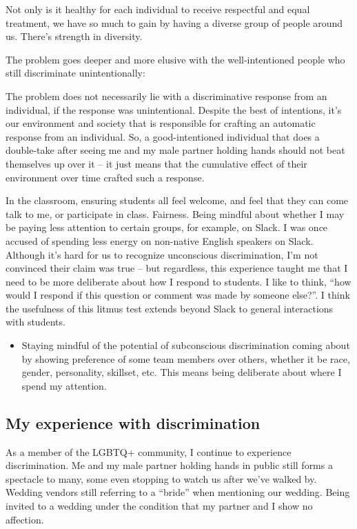 \documentclass[]{article}
\providecommand{\tightlist}{%
  \setlength{\itemsep}{0pt}\setlength{\parskip}{0pt}}
\begin{document}
Not only is it healthy for each individual to receive respectful and equal treatment, we have so much to gain by having a diverse group of people around us. There's strength in diversity.

The problem goes deeper and more elusive with the well-intentioned people who still discriminate unintentionally:

The problem does not necessarily lie with a discriminative response from an individual, if the response was unintentional. Despite the best of intentions, it's our environment and society that is responsible for crafting an automatic response from an individual. So, a good-intentioned individual that does a double-take after seeing me and my male partner holding hands should not beat themselves up over it -- it just means that the cumulative effect of their environment over time crafted such a response.

In the classroom, ensuring students all feel welcome, and feel that they can come talk to me, or participate in class. Fairness. Being mindful about whether I may be paying less attention to certain groups, for example, on Slack. I was once accused of spending less energy on non-native English speakers on Slack. Although it's hard for us to recognize unconscious discrimination, I'm not convinced their claim was true -- but regardless, this experience taught me that I need to be more deliberate about how I respond to students. I like to think, ``how would I respond if this question or comment was made by someone else?''. I think the usefulness of this litmus test extends beyond Slack to general interactions with students.

\begin{itemize}
\tightlist
\item
  Staying mindful of the potential of subconscious discrimination coming about by showing preference of some team members over others, whether it be race, gender, personality, skillset, etc. This means being deliberate about where I spend my attention.
\end{itemize}

\hypertarget{my-experience-with-discrimination}{%
\subsection{My experience with discrimination}\label{my-experience-with-discrimination}}

As a member of the LGBTQ+ community, I continue to experience discrimination. Me and my male partner holding hands in public still forms a spectacle to many, some even stopping to watch us after we've walked by. Wedding vendors still referring to a ``bride'' when mentioning our wedding. Being invited to a wedding under the condition that my partner and I show no affection.
\end{document}
